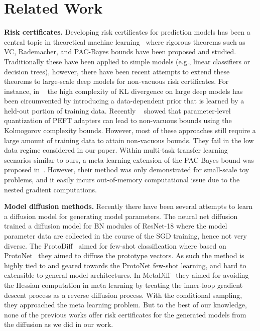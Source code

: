 \section{Related Work}
\label{sec:related}

\textbf{Risk certificates.}
Developing risk certificates for prediction models has been a central topic in theoretical machine learning~\citep{vapnik95,shalev2014understanding,fmm18} where rigorous theorems such as VC, Rademacher, and PAC-Bayes bounds have been proposed and studied. Traditionally these have been applied to simple models (e.g., linear classifiers or decision trees), however, there have been recent attempts to extend these theorems to large-scale deep models for non-vacuous risk certificates. For instance, in ~\citet{ortiz2021tighter} the high complexity of KL divergence on large deep models has been circumvented by introducing a data-dependent prior that is learned by a held-out portion of training data. Recently ~\citet{lotfi2024nonvacuousLLM} showed that parameter-level quantization of PEFT adapters can lead to non-vacuous bounds using the Kolmogorov complexity bounds. However, most of these approaches still require a large amount of training data to attain non-vacuous bounds. They fail in the low data regime considered in our paper. 
Within multi-task transfer learning scenarios similar to ours, a meta learning extension of the PAC-Bayes bound was proposed in~\citet{meta_pac_bayes}.
However, their method was only demonstrated for small-scale toy problems, and it easily incurs out-of-memory computational issue due to the nested gradient computations.

\textbf{Model diffusion methods.}
Recently there have been several attempts to learn a diffusion model for generating model parameters. The neural net diffusion~\citep{nndiffu} trained a diffusion model for BN modules of ResNet-18 where the model parameter data are collected in the course of the SGD training, hence not very diverse. 
The ProtoDiff~\citep{protodiff} aimed for few-shot classification where based on ProtoNet~\citep{protonet} they aimed to diffuse the prototype vectors. As such the method is highly tied to and geared towards the ProtoNet few-shot learning, and hard to extensible to general model architectures. 
In MetaDiff~\citep{metadiff} they aimed for avoiding the Hessian computation in meta learning by treating the  inner-loop gradient descent process as a reverse diffusion process. With the conditional sampling, they approached the meta learning problem. 
But to the best of our knowledge, none of the previous works offer risk certificates for the generated models from the diffusion as we did in our work. 


